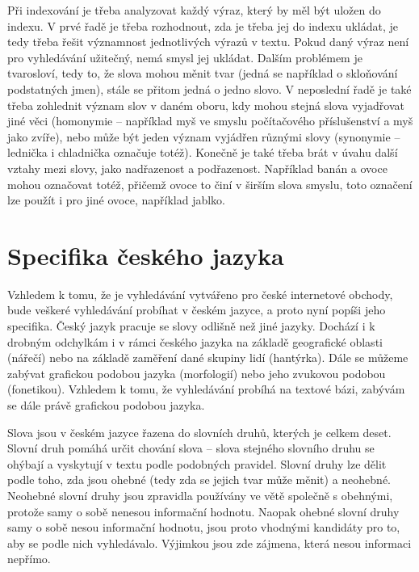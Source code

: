 \documentclass[FM,DP]{tulthesis}
\begin{document}
Při indexování je třeba analyzovat každý výraz, který by měl být uložen do indexu.
V prvé řadě je třeba rozhodnout, zda je třeba jej do indexu ukládat, je tedy 
třeba řešit významnost jednotlivých výrazů v textu. Pokud daný
výraz není pro vyhledávání užitečný, nemá smysl jej ukládat. Dalším problémem je 
tvarosloví, tedy to, že slova mohou měnit tvar (jedná se například o skloňování 
podstatných jmen), stále se přitom jedná o jedno slovo. V neposlední řadě je také 
třeba zohlednit význam slov v daném oboru, kdy mohou stejná slova vyjadřovat jiné věci 
(homonymie -- například myš ve smyslu počítačového příslušenství a myš jako zvíře), 
nebo může být jeden význam vyjádřen různými slovy (synonymie -- lednička i chladnička 
označuje totéž). Konečně je také třeba brát v úvahu další vztahy mezi slovy, 
jako nadřazenost a podřazenost. Například banán a ovoce mohou označovat totéž, 
přičemž ovoce to činí v širším slova smyslu, toto označení lze použít i pro jiné 
ovoce, například jablko.

\section{Specifika českého jazyka}

Vzhledem k tomu, že je vyhledávání vytvářeno pro české internetové obchody, 
bude veškeré vyhledávání probíhat v českém jazyce, a proto nyní popíši jeho specifika.
Český jazyk pracuje se slovy odlišně než jiné jazyky. Dochází i k drobným
odchylkám i v rámci českého jazyka na základě geografické oblasti (nářečí)
nebo na základě zaměření dané skupiny lidí (hantýrka). Dále se můžeme zabývat
grafickou podobou jazyka (morfologií) nebo jeho zvukovou podobou (fonetikou).
Vzhledem k tomu, že vyhledávání probíhá na textové bázi, zabývám se dále právě 
grafickou podobou jazyka.

Slova jsou v českém jazyce řazena do slovních druhů, kterých je celkem deset.
Slovní druh pomáhá určit chování slova -- slova stejného slovního druhu se ohýbají
a vyskytují v textu podle podobných pravidel. Slovní druhy lze dělit podle
toho, zda jsou ohebné (tedy zda se jejich tvar může měnit) a neohebné.
Neohebné slovní druhy jsou zpravidla používány ve větě společně s obehnými, 
protože samy o sobě nenesou informační hodnotu. Naopak ohebné slovní druhy
samy o sobě nesou informační hodnotu, jsou proto vhodnými kandidáty pro
to, aby se podle nich vyhledávalo. Výjimkou jsou zde zájmena, která nesou 
informaci nepřímo.
\end{document}
